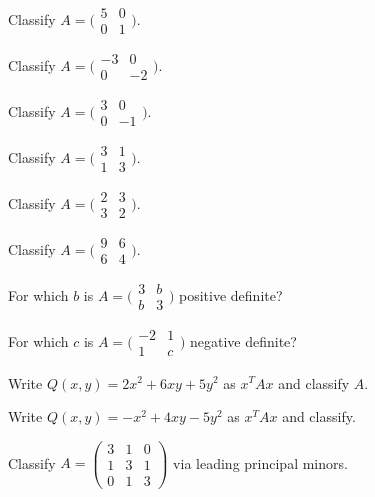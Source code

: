 \begin{problems}
    \item Classify $A = \bigl(\begin{smallmatrix} 5 & 0 \\ 0 & 1 \end{smallmatrix}\bigr)$.
    \item Classify $A = \bigl(\begin{smallmatrix} -3 & 0 \\ 0 & -2 \end{smallmatrix}\bigr)$.
    \item Classify $A = \bigl(\begin{smallmatrix} 3 & 0 \\ 0 & -1 \end{smallmatrix}\bigr)$.
    \item Classify $A = \bigl(\begin{smallmatrix} 3 & 1 \\ 1 & 3 \end{smallmatrix}\bigr)$.
    \item Classify $A = \bigl(\begin{smallmatrix} 2 & 3 \\ 3 & 2 \end{smallmatrix}\bigr)$.
    \item Classify $A = \bigl(\begin{smallmatrix} 9 & 6 \\ 6 & 4 \end{smallmatrix}\bigr)$.
    \item For which $b$ is $A = \bigl(\begin{smallmatrix} 3 & b \\ b & 3 \end{smallmatrix}\bigr)$ positive definite?
    \item For which $c$ is $A = \bigl(\begin{smallmatrix} -2 & 1 \\ 1 & c \end{smallmatrix}\bigr)$ negative definite?
    \item Write $Q(x, y) = 2 x^{2} + 6 x y + 5 y^{2}$ as $x^{T} A x$ and classify $A$.
    \item Write $Q(x, y) = -x^{2} + 4 x y - 5 y^{2}$ as $x^{T} A x$ and classify.
    \item Classify $A = \begin{pmatrix} 3 & 1 & 0 \\ 1 & 3 & 1 \\ 0 & 1 & 3 \end{pmatrix}$ via leading principal minors.

\end{problems}
